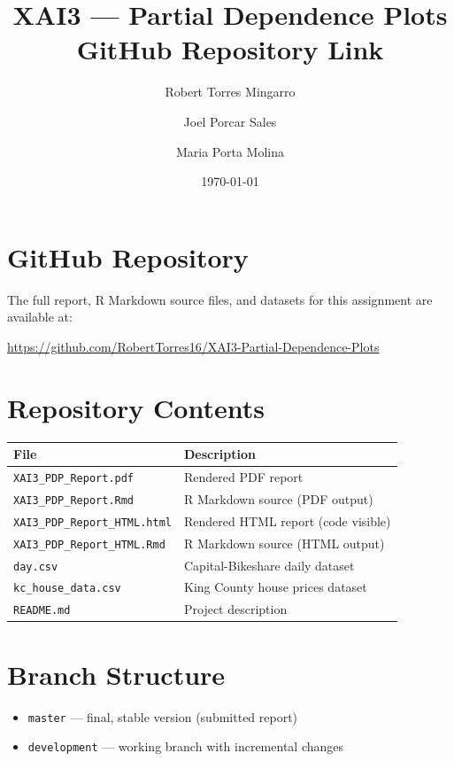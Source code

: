 \documentclass[12pt]{article}
\title{\textbf{XAI3 --- Partial Dependence Plots}\\[0.5em]
\large GitHub Repository Link}
\author{Robert Torres Mingarro \and Joel Porcar Sales \and Maria Porta Molina}
\date{\today}
\begin{document}
\maketitle

\section*{GitHub Repository}

The full report, R Markdown source files, and datasets for this assignment are available at:

\begin{center}
\Large
\href{https://github.com/RobertTorres16/XAI3-Partial-Dependence-Plots}{https://github.com/RobertTorres16/XAI3-Partial-Dependence-Plots}
\end{center}

\vspace{1em}

\section*{Repository Contents}

\begin{tabular}{ll}
\hline
\textbf{File} & \textbf{Description} \\
\hline
\texttt{XAI3\_PDP\_Report.pdf} & Rendered PDF report \\
\texttt{XAI3\_PDP\_Report.Rmd} & R Markdown source (PDF output) \\
\texttt{XAI3\_PDP\_Report\_HTML.html} & Rendered HTML report (code visible) \\
\texttt{XAI3\_PDP\_Report\_HTML.Rmd} & R Markdown source (HTML output) \\
\texttt{day.csv} & Capital-Bikeshare daily dataset \\
\texttt{kc\_house\_data.csv} & King County house prices dataset \\
\texttt{README.md} & Project description \\
\hline
\end{tabular}

\vspace{1em}

\section*{Branch Structure}

\begin{itemize}
    \item \texttt{master} --- final, stable version (submitted report)
    \item \texttt{development} --- working branch with incremental changes
\end{itemize}
\end{document}
